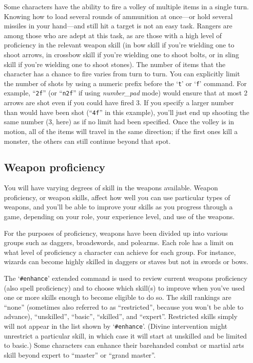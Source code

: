 Some characters have the ability to fire a volley of multiple items in a
single turn.  Knowing how to load several rounds of ammunition at
once---or hold several missiles in your hand---and still hit a
target is not an easy task.  Rangers are among those who are adept
at this task, as are those with a high level of proficiency in the
relevant weapon skill (in bow skill if you're wielding one to
shoot arrows, in crossbow skill if you're wielding one to shoot bolts,
or in sling skill if you're wielding one to shoot stones).
The number of items that the character has a chance to fire varies from
turn to turn.  You can explicitly limit the number of shots by using a
numeric prefix before the `{\tt t}' or `{\tt f}' command.
For example, ``{\tt 2f}'' (or ``{\tt n2f}'' if using
{\it number\_pad\/}
mode) would ensure that at most 2 arrows are shot
even if you could have fired 3.  If you specify
a larger number than would have been shot (``{\tt 4f}'' in this example),
you'll just end up shooting the same number (3, here) as if no limit
had been specified.  Once the volley is in motion, all of the items
will travel in the same direction; if the first ones kill a monster,
the others can still continue beyond that spot.

\subsection*{Weapon proficiency}

You will have varying degrees of skill in the weapons available.
Weapon proficiency, or weapon skills, affect how well you can use
particular types of weapons, and you'll be able to improve your skills
as you progress through a game, depending on your role, your experience
level, and use of the weapons.

For the purposes of proficiency, weapons have
been divided up into various groups such as daggers, broadswords, and
polearms.  Each role has a limit on what level of proficiency a character
can achieve for each group.  For instance, wizards can become highly
skilled in daggers or staves but not in swords or bows.

The `{\tt \#enhance}' extended command is used to review current weapons proficiency
(also spell proficiency) and to choose which skill(s) to improve when
you've used one or more skills enough to become eligible to do so.  The
skill rankings are ``none'' (sometimes also referred to as ``restricted'',
because you won't be able to advance), ``unskilled'', ``basic'', ``skilled'',
and ``expert''.  Restricted skills simply will not appear in the list
shown by `{\tt \#enhance}'.  (Divine intervention might unrestrict a particular
skill, in which case it will start at unskilled and be limited to basic.)
Some characters can enhance their barehanded combat or martial arts skill
beyond expert to ``master'' or ``grand master''.

